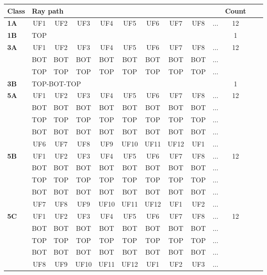 \begin{table}[h!]
\centering
\begin{tabular}{|l|c|c|c|c|c|c|c|c|c|c|c|c|}
\hline
Class &  \multicolumn{9}{l}{Ray path} \vline  & Count\\
\hline \hline
\textbf{1A} & UF1 & UF2 & UF3 & UF4 & UF5 & UF6 & UF7 & UF8 & $\dots$ & 12\\
\hline \hline
\textbf{1B} & \multicolumn{9}{l}{TOP} \vline  & 1\\
\hline \hline
\textbf{3A} & UF1 & UF2 & UF3 & UF4 & UF5 & UF6 & UF7 & UF8 & $\dots$ & 12\\
 & BOT & BOT & BOT & BOT & BOT & BOT & BOT & BOT & $\dots$ & \\
 & TOP & TOP & TOP & TOP & TOP & TOP & TOP & TOP & $\dots$ & \\
\hline \hline
\textbf{3B} & \multicolumn{9}{l}{TOP-BOT-TOP} \vline  & 1\\
\hline \hline
\textbf{5A} & UF1 & UF2 & UF3 & UF4 & UF5 & UF6 & UF7 & UF8 & $\dots$ & 12\\
 & BOT & BOT & BOT & BOT & BOT & BOT & BOT & BOT & $\dots$ & \\
 & TOP & TOP & TOP & TOP & TOP & TOP & TOP & TOP & $\dots$ & \\
 & BOT & BOT & BOT & BOT & BOT & BOT & BOT & BOT & $\dots$ & \\
 & UF6 & UF7 & UF8 & UF9 & UF10 & UF11 & UF12 & UF1 & $\dots$ & \\
\hline \hline
\textbf{5B} & UF1 & UF2 & UF3 & UF4 & UF5 & UF6 & UF7 & UF8 & $\dots$ & 12\\
 & BOT & BOT & BOT & BOT & BOT & BOT & BOT & BOT & $\dots$ & \\
 & TOP & TOP & TOP & TOP & TOP & TOP & TOP & TOP & $\dots$ & \\
 & BOT & BOT & BOT & BOT & BOT & BOT & BOT & BOT & $\dots$ & \\
 & UF7 & UF8 & UF9 & UF10 & UF11 & UF12 & UF1 & UF2 & $\dots$ & \\
\hline \hline
\textbf{5C} & UF1 & UF2 & UF3 & UF4 & UF5 & UF6 & UF7 & UF8 & $\dots$ & 12\\
 & BOT & BOT & BOT & BOT & BOT & BOT & BOT & BOT & $\dots$ & \\
 & TOP & TOP & TOP & TOP & TOP & TOP & TOP & TOP & $\dots$ & \\
 & BOT & BOT & BOT & BOT & BOT & BOT & BOT & BOT & $\dots$ & \\
 & UF8 & UF9 & UF10 & UF11 & UF12 & UF1 & UF2 & UF3 & $\dots$ & \\
\hline \hline

\end{tabular}
\end{table}
